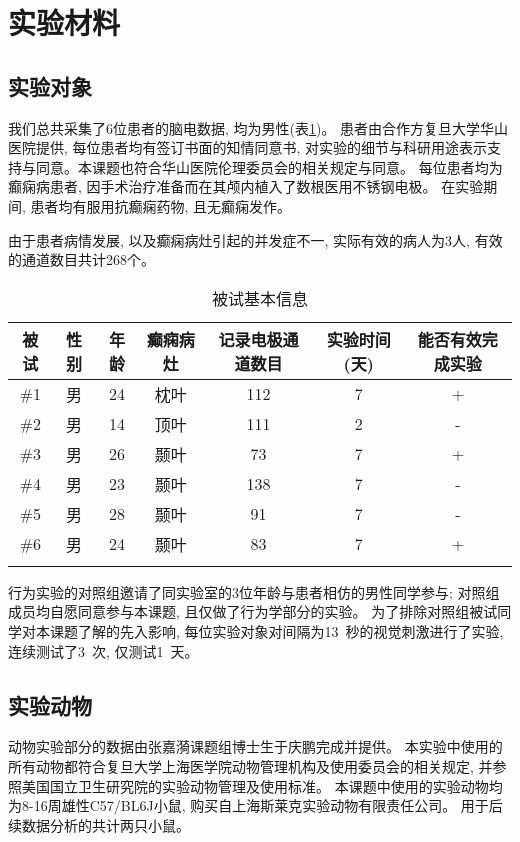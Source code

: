 \section{实验材料}

\subsection{实验对象}
我们总共采集了6位患者的脑电数据, 均为男性(表\ref{tab:patient_info})。
患者由合作方复旦大学华山医院提供, 每位患者均有签订书面的知情同意书,
对实验的细节与科研用途表示支持与同意。本课题也符合华山医院伦理委员会的相关规定与同意。
每位患者均为癫痫病患者, 因手术治疗准备而在其颅内植入了数根医用不锈钢电极。
在实验期间, 患者均有服用抗癫痫药物, 且无癫痫发作。

由于患者病情发展, 以及癫痫病灶引起的并发症不一, 实际有效的病人为3人,
有效的通道数目共计268个。

\begin{table}[h]
    \centering
    \caption{被试基本信息}
    \label{tab:patient_info}
    \begin{tabular}{ccccccc}
        \hline\noalign{\smallskip}
        被试 & 性别 & 年龄 & 癫痫病灶 & 记录电极通道数目 & 实验时间(天) & 能否有效完成实验\\
        \hline\noalign{\smallskip}
        \#1 & 男 & 24 & 枕叶 & 112 & 7 & +\\ %
        \#2 & 男 & 14 & 顶叶 & 111 & 2 & -\\ %
        \#3 & 男 & 26 & 颞叶 &  73 & 7 & +\\ %
        \#4 & 男 & 23 & 颞叶 & 138 & 7 & -\\ %
        \#5 & 男 & 28 & 颞叶 &  91 & 7 & -\\ %
        \#6 & 男 & 24 & 颞叶 &  83 & 7 & +\\ %

        \hline\noalign{\smallskip}

    \end{tabular}
\end{table}

行为实验的对照组邀请了同实验室的3位年龄与患者相仿的男性同学参与;
对照组成员均自愿同意参与本课题, 且仅做了行为学部分的实验。
为了排除对照组被试同学对本课题了解的先入影响,
每位实验对象对间隔为13~秒的视觉刺激进行了实验, 连续测试了3~次, 仅测试1~天。

\subsection{实验动物}
动物实验部分的数据由张嘉漪课题组博士生于庆鹏完成并提供。
本实验中使用的所有动物都符合复旦大学上海医学院动物管理机构及使用委员会的相关规定,
并参照美国国立卫生研究院的实验动物管理及使用标准。
本课题中使用的实验动物均为8-16周雄性C57/BL6J小鼠, 购买自上海斯莱克实验动物有限责任公司。
用于后续数据分析的共计两只小鼠。

